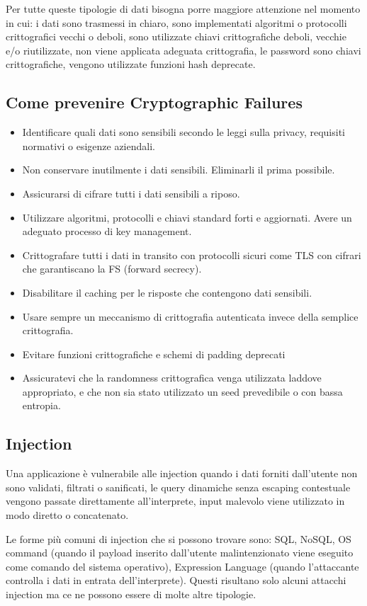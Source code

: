 Per tutte queste tipologie di dati bisogna porre maggiore attenzione nel momento in cui: i dati sono trasmessi in chiaro,  sono implementati algoritmi o protocolli crittografici vecchi o deboli,  sono utilizzate chiavi crittografiche deboli, vecchie e/o riutilizzate, non viene applicata adeguata crittografia, le password sono chiavi crittografiche, vengono utilizzate funzioni hash deprecate. 
\subsection{Come prevenire Cryptographic Failures} 
\begin{itemize}
    \item Identificare quali dati sono sensibili secondo le leggi sulla privacy, requisiti normativi o esigenze aziendali.
    \item Non conservare inutilmente i dati sensibili. Eliminarli il prima possibile.
    \item Assicurarsi di cifrare tutti i dati sensibili a riposo.
    \item Utilizzare algoritmi, protocolli e chiavi standard forti e aggiornati. Avere un adeguato processo di key management.
    \item Crittografare tutti i dati in transito con protocolli sicuri come TLS con cifrari che garantiscano la FS (forward secrecy).
    \item Disabilitare il caching per le risposte che contengono dati sensibili.
    \item Usare sempre un meccanismo di crittografia autenticata invece della semplice crittografia.
    \item Evitare funzioni crittografiche e schemi di padding deprecati
    \item Assicuratevi che la randomness crittografica venga utilizzata laddove appropriato, e che non sia stato utilizzato un seed prevedibile o con bassa entropia.  
\end{itemize}
\subsection{Injection} 
Una applicazione è vulnerabile alle injection quando i dati forniti dall’utente non sono validati, filtrati o sanificati, le query dinamiche senza escaping contestuale vengono passate direttamente all’interprete, input malevolo viene utilizzato in modo diretto o concatenato. 

Le forme più comuni di injection che si possono trovare sono: SQL, NoSQL, OS command (quando il payload inserito dall'utente malintenzionato viene eseguito come comando del sistema operativo), Expression Language (quando l’attaccante controlla i dati in entrata dell’interprete). Questi risultano solo alcuni attacchi injection ma ce ne possono essere di molte altre tipologie.
